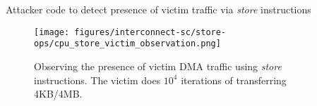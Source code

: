 \begin{minipage}{\textwidth}
    
    \captionsetup{type=lstlisting}
    \caption{Attacker code to detect presence of victim traffic via \textit{store} instructions}
    \label{lst:timing-victim-with-stores}
\end{minipage}

\begin{figure}[!htb]
    \centering
    \texttt{[image: figures/interconnect-sc/store-ops/cpu\_store\_victim\_observation.png]}
    \caption{Observing the presence of victim DMA traffic using \textit{store} instructions. The victim does $10^4$ iterations of transferring 4KB/4MB.}
    \label{fig:cpu-store-victim-observation}
\end{figure}
